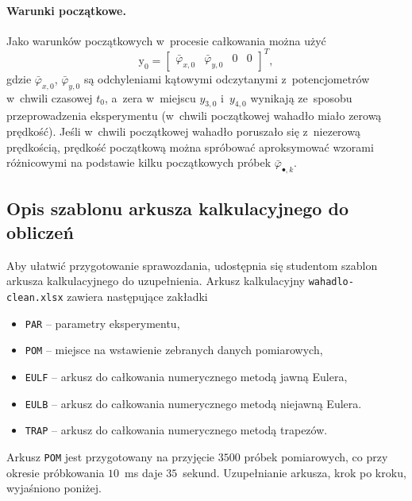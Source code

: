 \documentclass[paper=a4,DIV=12]{lpas}
\newcommand{\brm}[1]{\bm{\mathrm{#1}}}
\begin{document}
\paragraph{Warunki początkowe.}
Jako warunków początkowych w~procesie całkowania można użyć
\begin{equation}
  \brm{y}_0 = \begin{bmatrix}
    \bar{\varphi}_{x,0} & \bar{\varphi}_{y,0} & 0 & 0
  \end{bmatrix}^T,
\end{equation}
gdzie $\bar{\varphi}_{x,0}$, $\bar{\varphi}_{y,0}$ są odchyleniami kątowymi
odczytanymi z~potencjometrów w~chwili czasowej $t_0$, a~zera w~miejscu
$y_{3,0}$ i~$y_{4,0}$ wynikają ze~sposobu przeprowadzenia eksperymentu
(w~chwili początkowej wahadło miało zerową prędkość). Jeśli w~chwili
początkowej wahadło poruszało się z~niezerową prędkością, prędkość początkową
można spróbować aproksymować wzorami różnicowymi na podstawie kilku
początkowych próbek $\bar{\varphi}_{\bullet,k}$.

\subsection{Opis szablonu arkusza kalkulacyjnego do obliczeń}
\label{sec:CS7OJ}

Aby ułatwić przygotowanie sprawozdania, udostępnia się studentom szablon
arkusza kalkulacyjnego do uzupełnienia. Arkusz kalkulacyjny
\texttt{wahadlo-clean.xlsx} zawiera następujące zakładki
\begin{itemize}
  \item \texttt{PAR} -- parametry eksperymentu,
  \item \texttt{POM} -- miejsce na wstawienie zebranych danych pomiarowych,
  \item \texttt{EULF} -- arkusz do całkowania numerycznego metodą jawną Eulera,
  \item \texttt{EULB} -- arkusz do całkowania numerycznego metodą niejawną Eulera.
  \item \texttt{TRAP} -- arkusz do całkowania numerycznego metodą trapezów.
\end{itemize}

Arkusz \texttt{POM} jest przygotowany na przyjęcie $3500$ próbek pomiarowych,
co przy okresie próbkowania $10$~ms daje $35$~sekund. Uzupełnianie arkusza,
krok po kroku, wyjaśniono poniżej.
\end{document}
